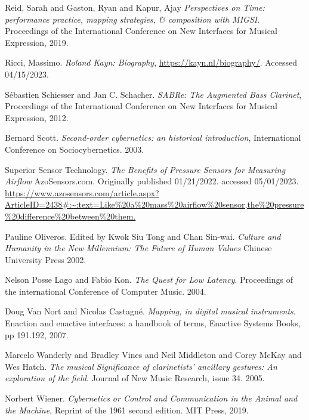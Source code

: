 \begin{thebibliography}{99}
 Reid, Sarah and Gaston, Ryan and Kapur, Ajay \emph{Perspectives on Time: performance practice, mapping strategies, \& composition with MIGSI}. Proceedings of the International Conference on New Interfaces for Musical Expression, 2019.

 Ricci, Massimo. \emph{Roland Kayn: Biography}, \url{https://kayn.nl/biography/}. Accessed 04/15/2023.

 S{\'e}bastien Schiesser and Jan C. Schacher. \emph{SABRe: The Augmented Bass Clarinet}, Proceedings of the International Conference on New Interfaces for Musical Expression, 2012.

 Bernard Scott. \emph{Second-order cybernetics: an historical introduction}, International Conference on Sociocybernetics. 2003.

 Superior Sensor Technology. \emph{The Benefits of Pressure Sensors for Measuring Airflow} AzoSensors.com. Originally published 01/21/2022. accessed 05/01/2023. \url{https://www.azosensors.com/article.aspx?ArticleID=2438#:~:text=Like\%20a\%20mass\%20airflow\%20sensor,the\%20pressure\%20difference\%20between\%20them.}

 Pauline Oliveros. Edited by  Kwok Siu Tong and Chan Sin-wai. \emph{Culture and Humanity in the New Millennium: The Future of Human Values} Chinese University Press 2002.

 Nelson Posse Lago and Fabio Kon. \emph{The Quest for Low Latency}. Proceedings of the international Conference of Computer Music. 2004.

 Doug Van Nort and Nicolas Castagné. \emph{Mapping, in digital musical instruments}. Enaction and enactive interfaces: a handbook of terms, Enactive Systems Books, pp 191.192, 2007.

 Marcelo Wanderly and Bradley Vines and Neil Middleton and Corey McKay and Wes Hatch. \emph{The musical Significance of clarinetists' ancillary gestures: An exploration of the field}. Journal of New Music Research, issue 34. 2005.

 Norbert Wiener. \emph{Cybernetics or Control and Communication in the Animal and the Machine}, Reprint of the 1961 second edition. MIT Press, 2019.

\end{thebibliography}


